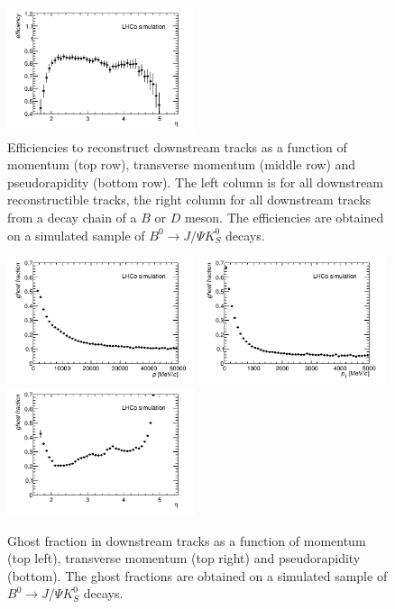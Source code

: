 \begin{figure}[tbph]
\begin{center}
\includegraphics[width = 0.49\textwidth]{figures/EffPatLLT/overall/BJpsiKSFromBDEta.png}
\caption{Efficiencies to reconstruct downstream tracks as a function of momentum
(top row), transverse momentum (middle row) and pseudorapidity (bottom row). The
left column is for all downstream reconstructible tracks, the right column for
all downstream tracks from a decay chain of a $B$ or $D$ meson. The efficiencies are
obtained on a simulated sample of  $B^{0} \rightarrow J/\Psi K^{0}_{S}$ decays.}
\label{fig:EffPatLLTBJpsiK}
 \end{center}
\end{figure}
\begin{figure}[tbph]
\begin{center}
\includegraphics[width = 0.49\textwidth]{figures/EffPatLLT/overall/BJpsiKSGhostFracP.png}
\includegraphics[width = 0.49\textwidth]{figures/EffPatLLT/overall/BJpsiKSGhostFracPt.png}
\includegraphics[width = 0.49\textwidth]{figures/EffPatLLT/overall/BJpsiKSGhostFracEta.png}
\caption{Ghost fraction in downstream tracks as a function of momentum (top
left), transverse momentum (top right) and pseudorapidity (bottom). The ghost
fractions are obtained on a simulated sample of  $B^{0} \rightarrow J/\Psi K^{0}_{S}$ decays.}
\label{fig:ghostPatLLTBJpsiK}
 \end{center}
 \end{figure}

